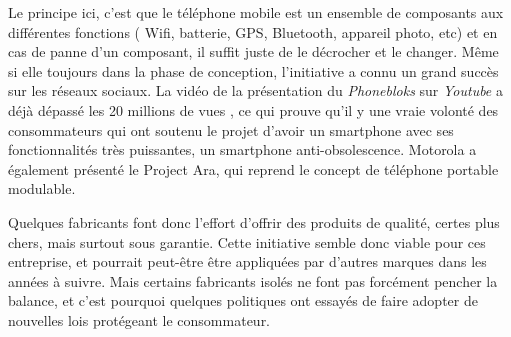 \bigbreak
Le principe ici, c'est que le téléphone mobile est un ensemble de composants aux différentes fonctions ( Wifi, batterie, GPS, Bluetooth, appareil photo, etc) et en cas de panne d'un composant, il suffit juste de le décrocher et le changer. 
Même si elle toujours dans la phase de conception, l'initiative a connu un grand succès sur les réseaux sociaux. La vidéo de la présentation du \textit{Phonebloks} sur \textit{Youtube} a déjà dépassé les 20 millions de vues \cite{pb_yt}, ce qui prouve qu'il y une vraie volonté des consommateurs qui ont soutenu le projet d'avoir un smartphone avec ses fonctionnalités très puissantes, un smartphone anti-obsolescence. Motorola a également présenté le Project Ara, qui reprend le concept de téléphone portable modulable.


\bigbreak
Quelques fabricants font donc l'effort d'offrir des produits de qualité, certes plus chers, mais surtout sous garantie. Cette initiative semble donc viable pour ces entreprise, et pourrait peut-être être appliquées par d'autres marques dans les années à suivre. Mais certains fabricants isolés ne font pas forcément pencher la balance, et c'est pourquoi quelques politiques ont essayés de faire adopter de nouvelles lois protégeant le consommateur.









